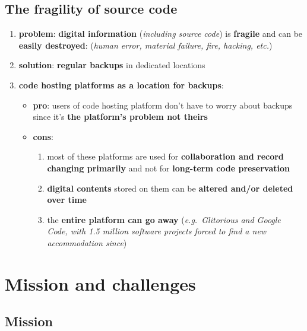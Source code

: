\documentclass[11pt]{article}
\providecommand{\tightlist}{%
      \setlength{\itemsep}{0pt}\setlength{\parskip}{0pt}}
\begin{document}
\hypertarget{the-fragility-of-source-code}{%
\subsection{The fragility of source
code}\label{the-fragility-of-source-code}}

\begin{enumerate}
\def\labelenumi{\arabic{enumi}.}
\tightlist
\item
  \textbf{problem}: \textbf{digital information} (\emph{including source
  code}) is \textbf{fragile} and can be \textbf{easily destroyed}:
  (\emph{human error, material failure, fire, hacking, etc.})
\item
  \textbf{solution}: \textbf{regular backups} in dedicated locations
\item
  \textbf{code hosting platforms as a location for backups}:

  \begin{itemize}
  \tightlist
  \item
    \textbf{pro}: users of code hosting platform don't have to worry
    about backups since it's \textbf{the platform's problem not theirs}
  \item
    \textbf{cons}:

    \begin{enumerate}
    \def\labelenumii{\arabic{enumii}.}
    \tightlist
    \item
      most of these platforms are used for \textbf{collaboration and
      record changing primarily} and not for \textbf{long-term code
      preservation}
    \item
      \textbf{digital contents} stored on them can be \textbf{altered
      and/or deleted over time}
    \item
      the \textbf{entire platform can go away} (\emph{e.g.~Glitorious
      and Google Code, with 1.5 million software projects forced to find
      a new accommodation since})
    \end{enumerate}
  \end{itemize}
\end{enumerate}

\hypertarget{mission-and-challenges}{%
\section{Mission and challenges}\label{mission-and-challenges}}

\hypertarget{mission}{%
\subsection{Mission}\label{mission}}
\end{document}
